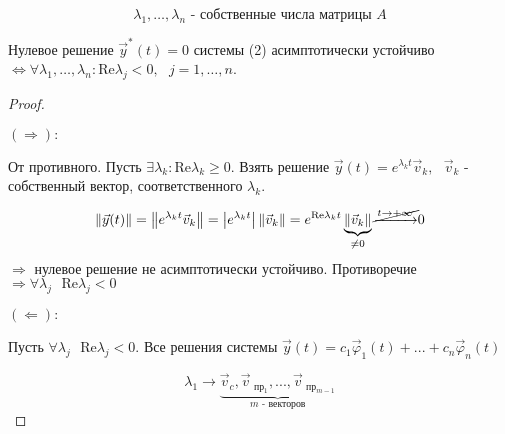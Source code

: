 \documentclass[12pt, a4paper]{report}
\begin{document}
\fi

\[ \lambda_1, \ldots, \lambda_n \text{  - собственные числа матрицы } A  \] 

\begin{theorem}
    Нулевое решение \( \vec{y } ^* (t )= 0\) системы (2) асимптотически устойчиво \( \Leftrightarrow  \forall  \lambda_1, \ldots, \lambda_n :  \mathrm{Re } \lambda_j < 0 , \text{ }  j=1, \ldots, n \).
\end{theorem}

\begin{proof} \(  \) 

    \( (\Rightarrow): \)

    От противного. Пусть \( \exists  \lambda_k : \mathrm{Re } \lambda_k \ge  0  \). Взять решение \( \vec{y } (t ) =  e^{ \lambda_k t } \vec{v }_k , \text{ }  \vec{v } _k \) - собственный вектор, соответственного \( \lambda_k \). 

    \[ \left\lVert  \vec{y } (t) \right\rVert = \left\lVert e^{\lambda_k t } \vec{v } _k   \right\rVert = \left\lvert e^{ \lambda_k t }  \right\rvert \left\lVert  \vec{v }  _k  \right\rVert  = e^{\mathrm{Re } \lambda_k t  } \underbrace{\left\lVert \vec{v } _k  \right\rVert}_{\neq 0} \cancel{\xrightarrow{ t \to  +\infty }} 0    \] 
    \( \Rightarrow \) нулевое решение не асимптотически устойчиво. Противоречие \( \Rightarrow  \forall  \lambda_j \text{ }  \mathrm{Re }  \lambda_j < 0  \) 

    \( (\Leftarrow): \) 

    Пусть \( \forall  \lambda_j \text{ }  \mathrm{Re }  \lambda_j < 0   \). Все решения системы \( \vec{y } (t ) = c_1 \vec{\varphi }_1 (t )+ ... + c_n \vec{\varphi }_n (t)   \) 
    
    \[ \lambda_1 \to \underbrace{ \vec{v } _c , \vec{v } _{\text{ пр}_1 },...,  \vec{v } _{\text{ пр}_{m-1} }}_{m \text{ - векторов} }  \] 


\end{proof}
\end{document}
